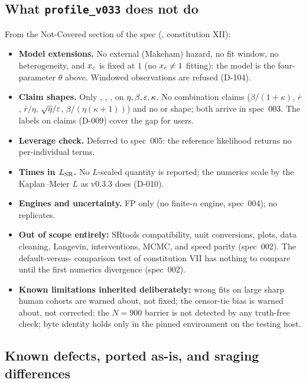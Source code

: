 \subsection{What \texttt{profile\_v033} does not do}\label{sec:pv-notcovered}

From the Not-Covered section of the spec (, constitution XII):
\begin{itemize}[nosep]
  \item \textbf{Model extensions.} No external (Makeham) hazard, no fit window, no heterogeneity, and $x_c$ is
    fixed at $1$ (no $x_c\ne1$ fitting): the model is the four-parameter $\theta$ above. Windowed observations
    are refused (D-104).
  \item \textbf{Claim shapes.} Only , , ,  on
    $\eta,\beta,\varepsilon,\kappa$. No combination claims ($\beta/(1+\kappa)$, $\bar r$, $\bar r/\eta$, $\sqrt\eta/\varepsilon$,
    $\beta/(\eta(\kappa+1))$) and no  or  shape; both arrive in
    spec~003. The labels on claims (D-009) cover the gap for users.
  \item \textbf{Leverage check.} Deferred to spec~005: the reference likelihood returns no per-individual terms.
  \item \textbf{Times in $L_{\rm SR}$.} No $L$-scaled quantity is reported; the numerics scale by the
    Kaplan--Meier $L$ as v0.3.3 does (D-010).
  \item \textbf{Engines and uncertainty.} FP only (no finite-$n$ engine, spec~004); no replicates.
  \item \textbf{Out of scope entirely:} SRtools compatibility, unit conversions, plots, data cleaning, Langevin,
    interventions, MCMC, and speed parity (spec~002). The default-versus- comparison test of
    constitution VII has nothing to compare until the first numerics divergence (spec~002).
  \item \textbf{Known limitations inherited deliberately:} wrong fits on large sharp human cohorts are warned
    about, not fixed; the censor-tie bias is warned about, not corrected; the $N=900$ barrier is not detected by
    any truth-free check; byte identity holds only in the pinned environment on the testing host.
\end{itemize}

\subsection{Known defects, ported as-is, and sraging differences}\label{sec:pv-defects}

